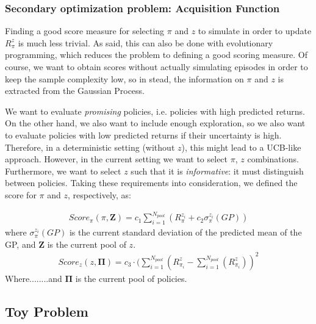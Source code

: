 \subsubsection{Secondary optimization problem: Acquisition Function}

Finding a good score measure for selecting $\pi$ and $z$ to simulate in order to update $R_{\pi}^z$ is much less trivial. As said, this can also be done with evolutionary programming, which reduces the problem to defining a good scoring measure. Of course, we want to obtain scores without actually simulating episodes in order to keep the sample complexity low, so in stead,  the information on $\pi$ and $z$ is extracted from the Gaussian Process. 

We want to evaluate \textit{promising} policies, i.e. policies with high predicted returns. On the other hand, we also want to include enough exploration, so we also want to evaluate policies with low predicted returns if their uncertainty is high. Therefore, in a deterministic setting (without $z$), this might lead to a UCB-like approach. %
However, in the current setting we want to select $\pi$, $z$ combinations. Furthermore, we want to select $z$ such that it is \textit{informative}: it must distinguish between policies. Taking these requirements into consideration, we defined the score for $\pi$ and $z$, respectively, as: 

\begin{align}
Score_{\pi}(\pi ,\mathbf{Z}) = c_1 \sum_{i=1}^{N_{pool}} (R_{\pi}^{z_i} + c_2 \sigma_{\pi}^{z_i}(GP)) 
\end{align}
where $\sigma_{\pi}^{z_i}(GP)$ is the current standard deviation of the predicted mean of the GP, and $\mathbf{Z}$ is the current pool of $z$.
\begin{align}
Score_z(z, \mathbf{\Pi}) = c_3 \cdot (\sum_{i=1}^{N_{pool}}(R_{\pi_i}^z-\sum_{i=1}^{N_{pool}}(R_{\pi_i}^z) )^2
\end{align}
Where........and $\mathbf{\Pi}$ is the current pool of policies.

\subsection{Toy Problem}

